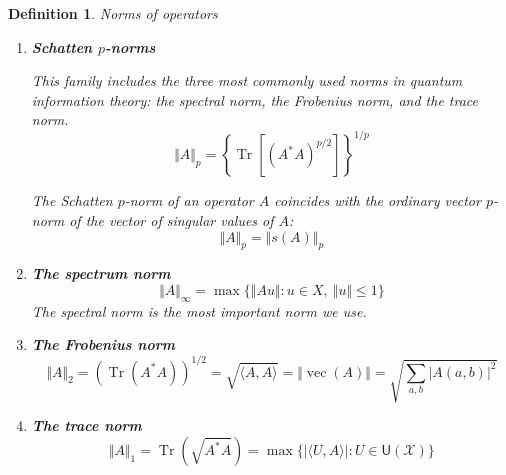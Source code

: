 \documentclass[aps,pra,onecolumn,notitlepage,superscriptaddress]{revtex4-1}
\newcommand{\spc}[1]{\mathcal{#1}}
\newcommand{\U}{\mathsf{U}}
\def\>{\rangle}
\def\<{\langle}
\newcommand{\Tr}{\operatorname{Tr}}
\newcommand{\op}[1]{\operatorname{#1}}
\newtheorem{defi}{Definition}
\begin{document}
    \begin{defi}
        Norms of operators
        \begin{enumerate}
            \item \textbf{Schatten $p$-norms}

            This family includes the three most commonly used norms in quantum information theory: the spectral norm, the Frobenius norm, and the trace norm.
            \begin{equation}
                \Vert A \Vert_p = \left\{ \Tr \left[ \left( A^*A \right)^{p/2} \right] \right\}^{1/p}
            \end{equation}

            The Schatten $p$-norm of an operator $A$ coincides with the ordinary vector $p$-norm of the vector of singular values of $A$:
            \begin{equation}
                \Vert A \Vert_p = \Vert s(A) \Vert_p
            \end{equation}

            \item \textbf{The spectrum norm}
            \begin{equation}
                \Vert A \Vert_\infty = \max \{ \Vert Au \Vert : u \in X, \ \Vert u \Vert \leq 1 \}
            \end{equation}
            The spectral norm is the most important norm we use.

            \item \textbf{The Frobenius norm} 
            \begin{equation}
                \Vert A \Vert_2 = (\Tr(A^*A))^{1/2} = \sqrt{\< A, A \>} = \Vert \op{vec}(A) \Vert = \sqrt{\sum_{a,b} |A(a,b)|^2 }
            \end{equation}

            \item \textbf{The trace norm} 
            \begin{equation}
                \Vert A \Vert_1 = \Tr(\sqrt{A^*A}) = \max\{ |\< U,A \>| : U \in \U(\spc X) \}
            \end{equation}
        \end{enumerate}
    \end{defi}
\end{document}
